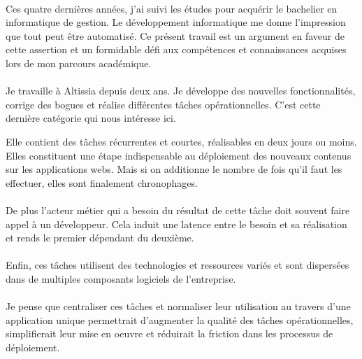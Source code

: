 \paragraph{}
Ces quatre dernières années, j'ai suivi les études pour acquérir le bachelier en informatique de gestion.
Le développement informatique me donne l'impression que tout peut être automatisé.
Ce présent travail est un argument en faveur de cette assertion et un formidable défi aux compétences et connaissances acquises lors de mon parcours académique.

\paragraph{}
Je travaille à Altissia depuis deux ans.
Je développe des nouvelles fonctionnalités, corrige des bogues et réalise différentes tâches opérationnelles.
C'est cette dernière catégorie qui nous intéresse ici.

Elle contient des tâches récurrentes et courtes, réalisables en deux jours ou moins.
Elles constituent une étape indispensable au déploiement des nouveaux contenus sur les applications webs.
Mais si on additionne le nombre de fois qu'il faut les effectuer, elles sont finalement chronophages.

\paragraph{}
De plus l'acteur métier qui a besoin du résultat de cette tâche doit souvent faire appel à un développeur. Cela induit une latence entre le besoin et sa réalisation et rends le premier dépendant du deuxième.

\paragraph{}
Enfin, ces tâches utilisent des technologies et ressources variés et sont dispersées dans de multiples composants logiciels de l'entreprise.

\paragraph{}
Je pense que centraliser ces tâches et normaliser leur utilisation au travers d'une application unique permettrait d'augmenter la qualité des tâches opérationnelles, simplifierait leur mise en oeuvre et réduirait la friction dans les processus de déploiement.

